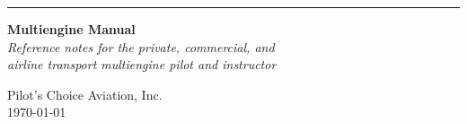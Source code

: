 \documentclass[11pt,twoside,letterpaper,onecolumn]{book}
\newenvironment{dedication}
  {\clearpage           %
   \thispagestyle{empty}%
   \vspace*{\stretch{1}}%
   \itshape             %
   \raggedleft          %
  }
  {\par %
   \vspace{\stretch{3}} %
   \clearpage           %
  }
\begin{document}
\begin{titlepage} %
\raggedleft %
\rule{1pt}{\textheight} %
\hspace{0.05\textwidth} %
\parbox[b]{0.75\textwidth}{ %
{\Huge\bfseries Multiengine Manual}\\[2\baselineskip] %
{\large\textit{Reference notes for the private, commercial, and \\
    airline transport multiengine pilot and instructor}}\\[4\baselineskip] %


\vspace{0.5\textheight} %

{\noindent Pilot's Choice Aviation, Inc.}\\[\baselineskip] %
{\noindent \today }\\[\baselineskip] %
}

\end{titlepage}

\end{document}
